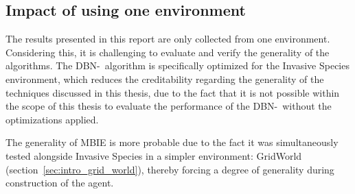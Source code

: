 \subsection{Impact of using one environment}
\label{sec:impact_of_one_env}

The results presented in this report are only collected from one environment.
Considering this, it is challenging to evaluate and verify the generality of the
algorithms. The DBN-\etre\ algorithm is specifically optimized for the Invasive Species
environment, which reduces the creditability regarding the generality of the
techniques discussed in this thesis, due to the fact that it is not possible
within the scope of this thesis to evaluate the performance of the DBN-\etre\,
without the optimizations applied. 

The generality of MBIE is more probable due to the fact it was simultaneously
tested alongside Invasive Species in a simpler environment: GridWorld
(section~\ref{sec:intro_grid_world}), thereby forcing a degree of generality during
construction of the agent.
